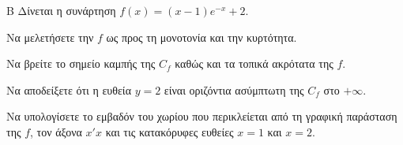 \begin{thema}{Β}
Δίνεται η συνάρτηση $f(x) = (x-1)e^{-x} + 2$.
\begin{erwthma}
\item Να μελετήσετε την $f$ ως προς τη μονοτονία και την κυρτότητα.
\item Να βρείτε το σημείο καμπής της $C_f$ καθώς και τα τοπικά ακρότατα της $f$.
\item Να αποδείξετε ότι η ευθεία $y = 2$ είναι οριζόντια ασύμπτωτη της $C_f$ στο $+\infty$.
\item Να υπολογίσετε το εμβαδόν του χωρίου που περικλείεται από τη γραφική παράσταση της $f$, τον άξονα $x'x$ και τις κατακόρυφες ευθείες $x=1$ και $x=2$.
\end{erwthma}
\end{thema}

